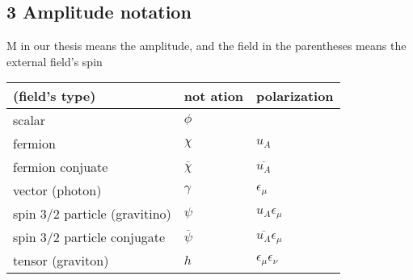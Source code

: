 \documentclass[11pt,a4paper]{article}
\begin{document}
\subsection{3 Amplitude notation}
M in our thesis means the amplitude, and the field in the parentheses means the external field's spin 
\begin{center}
\begin{tabularx}{\textwidth}{|K|K|K|}
\hline 
 \textbf{(field's type)} & \textbf{not \!ation} & \textbf{polarization} \\
\hline\hline 
 scalar & $\displaystyle \phi $ &  \\
\hline 
 fermion & $\displaystyle \chi $ & $\displaystyle u_{A}$ \\
\hline 
 fermion conjuate & $\displaystyle \overline{\chi }$ & $\displaystyle \overline{u_{A}}$ \\
\hline 
 vector (photon) & $\displaystyle \gamma $ & $\displaystyle \epsilon _{\mu }$ \\
\hline 
 spin 3/2 particle (gravitino) & $\displaystyle \psi $ & $\displaystyle u_{A}$$\displaystyle \epsilon _{\mu }$ \\
\hline 
 {\small spin 3/2 particle conjugate} & $\displaystyle \overline{\psi }$ & $\displaystyle \overline{u_{A}}$$\displaystyle \epsilon _{\mu }$ \\
\hline 
 tensor (graviton) & $\displaystyle h$ & $\displaystyle \epsilon _{\mu }$$\displaystyle \epsilon _{\nu }$ \\
 \hline
\end{tabularx}
\end{center}
\end{document}
